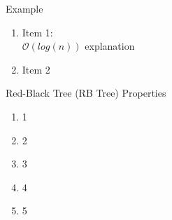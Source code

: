 \documentclass{beamer}
\begin{document}
\begin{frame}{Example}
	\begin{enumerate}
		\pause
		\item Item 1:\\
		 $\mathcal{O}(log(n))$ explanation
		\pause
		\item Item 2 
	\end{enumerate}
\end{frame}



\begin{frame}

	\begin{block}{Red-Black Tree (RB Tree) Properties}
		\begin{enumerate}
			\small
			\item <2-> 1
			\item <3-> 2
			\item <4-> 3
			\item <5-> 4
			\item <6-> 5
		\end{enumerate}
	\end{block}
\end{frame}



\end{document}
